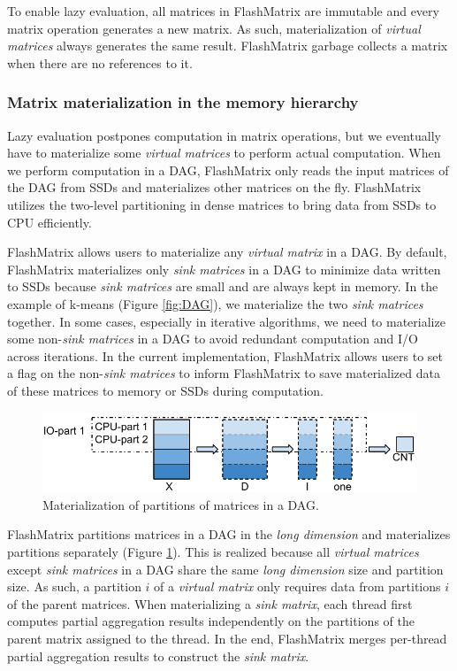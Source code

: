 To enable lazy evaluation, all matrices in FlashMatrix are immutable and every
matrix operation generates a new matrix. As such, materialization of
\textit{virtual matrices} always generates the same result. FlashMatrix
garbage collects a matrix when there are no references to it.

\subsubsection{Matrix materialization in the memory hierarchy} \label{sec:materialize}
Lazy evaluation postpones computation in matrix operations, but we eventually
have to materialize some \textit{virtual matrices} to perform actual computation.
When we perform computation in a DAG, FlashMatrix only reads the input matrices
of the DAG from SSDs and materializes other matrices on the fly.
FlashMatrix utilizes the two-level
partitioning in dense matrices to bring data from SSDs to CPU efficiently.

FlashMatrix allows users to materialize any \textit{virtual matrix} in a DAG.
By default, FlashMatrix materializes only \textit{sink matrices} in a DAG to
minimize data written to SSDs because \textit{sink matrices} are small and
are always kept in memory. In the example of k-means (Figure \ref{fig:DAG}),
we materialize the two \textit{sink matrices} together. In some cases,
especially in iterative algorithms,
we need to materialize some non-\textit{sink matrices} in a DAG to avoid
redundant computation and I/O across iterations. In the current implementation,
FlashMatrix allows users to set a flag on the
non-\textit{sink matrices} to inform FlashMatrix to save materialized data
of these matrices to memory or SSDs during computation.

\begin{figure}
	\centering
	\includegraphics[scale=0.6]{FlashMatrix_figs/materialize.pdf}
	\caption{Materialization of partitions of matrices in a DAG.}
	\label{fig:mater}
\end{figure}

FlashMatrix partitions matrices in a DAG in the \textit{long dimension} and
materializes partitions separately (Figure \ref{fig:mater}). This is realized
because all \textit{virtual matrices} except \textit{sink matrices} in a DAG
share the same \textit{long dimension} size and partition size. As such,
a partition $i$ of a \textit{virtual matrix} only requires data from partitions
$i$ of the parent matrices.
When materializing a \textit{sink matrix}, each thread first computes partial
aggregation results independently on the partitions of the parent matrix
assigned to the thread. In the end, FlashMatrix merges per-thread partial
aggregation results to construct the \textit{sink matrix}.


